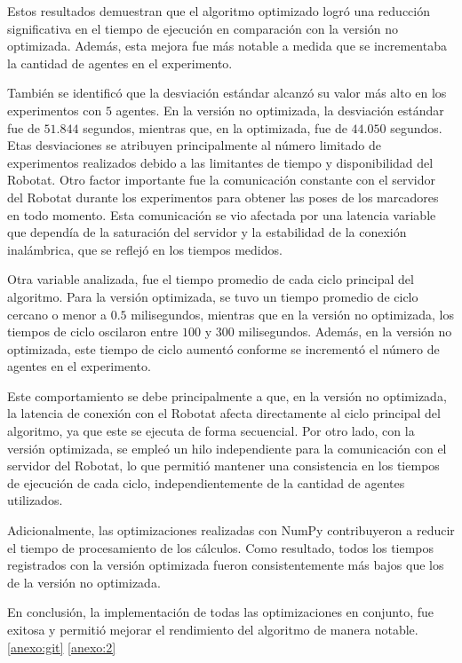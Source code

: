 Estos resultados demuestran que el algoritmo optimizado logró una reducción significativa en el tiempo de ejecución en comparación con la versión no optimizada. Además, esta mejora fue más notable a medida que se incrementaba la cantidad de agentes en el experimento.

También se identificó que la desviación estándar alcanzó su valor más alto en los experimentos con $5$ agentes. En la versión no optimizada, la desviación estándar fue de $51.844$ segundos, mientras que, en la optimizada, fue de $44.050$ segundos. Etas desviaciones se atribuyen principalmente al número limitado de experimentos realizados debido a las limitantes de tiempo y disponibilidad del Robotat. Otro factor importante fue la comunicación constante con el servidor del Robotat durante los experimentos para obtener las poses de los marcadores en todo momento. Esta comunicación se vio afectada por una latencia variable que dependía de la saturación del servidor y la estabilidad de la conexión inalámbrica, que se reflejó en los tiempos medidos.

Otra variable analizada, fue el tiempo promedio de cada ciclo principal del algoritmo. Para la versión optimizada, se tuvo un tiempo promedio de ciclo cercano o menor a $0.5$ milisegundos, mientras que en la versión no optimizada, los tiempos de ciclo oscilaron entre $100$ y $300$ milisegundos. Además, en la versión no optimizada, este tiempo de ciclo aumentó conforme se incrementó el número de agentes en el experimento.

Este comportamiento se debe principalmente a que, en la versión no optimizada, la latencia de conexión con el Robotat afecta directamente al ciclo principal del algoritmo, ya que este se ejecuta de forma secuencial. Por otro lado, con la versión optimizada, se empleó un hilo independiente para la comunicación con el servidor del Robotat, lo que permitió mantener una consistencia en los tiempos de ejecución de cada ciclo, independientemente de la cantidad de agentes utilizados. 

Adicionalmente, las optimizaciones realizadas con NumPy contribuyeron a reducir el tiempo de procesamiento de los cálculos. Como resultado, todos los tiempos registrados con la versión optimizada fueron consistentemente más bajos que los de la versión no optimizada.

En conclusión, la implementación de todas las optimizaciones en conjunto, fue exitosa y permitió mejorar el rendimiento del algoritmo de manera notable. \ref{anexo:git} \ref{anexo:2}

